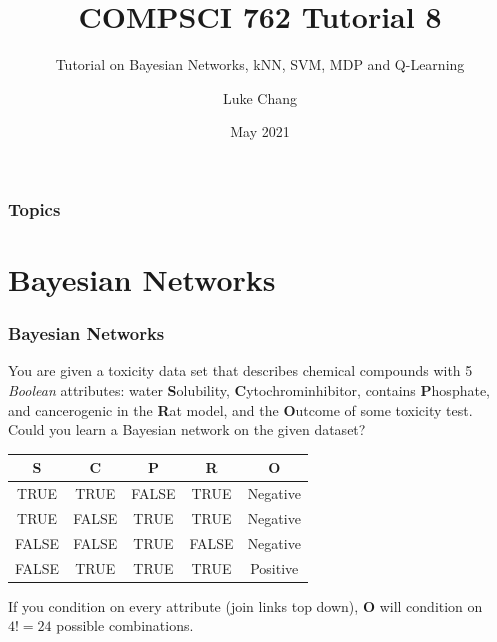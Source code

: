 \documentclass[aspectratio=169, 10pt]{beamer}
\title{COMPSCI 762 Tutorial 8}
\subtitle{Tutorial on Bayesian Networks, kNN, SVM, MDP and Q-Learning}
\author{Luke Chang}
\institute{The University of Auckland}
\date{May 2021}
\begin{document}
\frame{\titlepage}

\begin{frame}
    \frametitle{Topics}

    \tableofcontents
        
\end{frame}

\section{Bayesian Networks}
\begin{frame}[t]
    \frametitle{Bayesian Networks}

    \begin{example}
        You are given a toxicity data set that describes chemical compounds with 5 \textit{Boolean}
        attributes: water \textbf{S}olubility, \textbf{C}ytochrominhibitor, contains \textbf{P}hosphate, and
        cancerogenic in the \textbf{R}at model, and the \textbf{O}utcome of some toxicity test.\\
        Could you learn a Bayesian network on the given dataset?
    \end{example}
    
    \begin{table}[]
        \small
        \begin{tabular}{cccc|c}
        \textbf{S} & \textbf{C} & \textbf{P} & \textbf{R} & \textbf{O} \\ \hline
        TRUE       & TRUE       & FALSE      & TRUE       & Negative   \\
        TRUE       & FALSE      & TRUE       & TRUE       & Negative   \\
        FALSE      & FALSE      & TRUE       & FALSE      & Negative   \\
        FALSE      & TRUE       & TRUE       & TRUE       & Positive  
        \end{tabular}
    \end{table}

    \vspace{2em}
    If you condition on every attribute (join links top down), \textbf{O} will condition on $4!=24$ possible combinations.
\end{frame}
\end{document}
